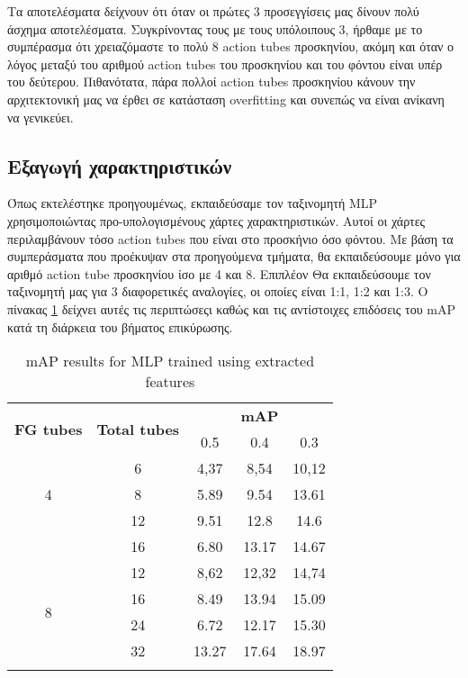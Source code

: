 Τα αποτελέσματα δείχνουν ότι όταν οι πρώτες 3 προσεγγίσεις μας δίνουν πολύ άσχημα αποτελέσματα.
Συγκρίνοντας τους με τους υπόλοιπους 3, ήρθαμε με το συμπέρασμα ότι χρειαζόμαστε
το πολύ 8 \en action tubes \gr προσκηνίου, ακόμη και όταν ο λόγος μεταξύ του αριθμού \en action tubes \gr
του προσκηνίου και του φόντου είναι υπέρ του δεύτερου. Πιθανότατα, πάρα πολλοί
\en action tubes \gr προσκηνίου κάνουν την αρχιτεκτονική μας να έρθει σε κατάσταση \en overfitting \gr και
συνεπώς να είναι ανίκανη να γενικεύει.

\subsection{Εξαγωγή χαρακτηριστικών}

Όπως εκτελέστηκε προηγουμένως, εκπαιδεύσαμε τον ταξινομητή \en MLP \gr χρησιμοποιώντας προ-υπολογισμένους
χάρτες χαρακτηριστικών. Αυτοί οι χάρτες περιλαμβάνουν τόσο \en action tubes \gr που είναι στο  προσκήνιο όσο φόντου. Με
βάση τα συμπεράσματα που προέκυψαν  στα προηγούμενα τμήματα, θα εκπαιδεύσουμε
μόνο για  αριθμό \en action tube \gr προσκηνίου ίσο με 4 και 8. Επιπλέον
Θα  εκπαιδεύσουμε τον ταξινομητή μας για 3 διαφορετικές αναλογίες, οι οποίες είναι 1:1, 1:2 και 1:3.
Ο πίνακας \ref{table:gr_mlp_extract_jhdmb} δείχνει αυτές τις περιπτώσεςι καθώς 
και τις αντίστοιχες επιδόσεις του \en mAP \gr κατά τη διάρκεια του βήματος επικύρωσης.
\begin{center}
  \en
  \begin{longtable}{|| c | c || c c c ||}
    \hline
    \multirow{2}{*}{\textbf{FG tubes}} & \multirow{2}{*}{\textbf{Total tubes}} & {} & \textbf{mAP} & {} \\
    {} & {} & 0.5 & 0.4 & 0.3 \\
    \hline
    \multirow{3}{*}{4} & 6 & 4,37 & 8,54 & 10,12 \\
    \cline{2-5}
    {} & 8 & 5.89 & 9.54 & 13.61 \\
    \cline{2-5}
    {} & 12 & 9.51 & 12.8 & 14.6  \\
    \cline{2-5}
    {} & 16 & 6.80 & 13.17 & 14.67 \\
    \hline
    \multirow{4}{*}{8} & 12 & 8,62 & 12,32 & 14,74 \\
    \cline{2-5}
    {} & 16 & 8.49 & 13.94 & 15.09 \\
    \cline{2-5}
    {} & 24 & 6.72 & 12.17 & 15.30 \\
    \cline{2-5}
    {} & 32 & 13.27 & 17.64 & 18.97 \\
    \hline

  \caption{mAP results for MLP trained using extracted features}
  \label{table:gr_mlp_extract_jhdmb}
\end{longtable}
\end{center}

